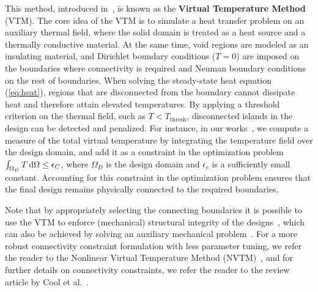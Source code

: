 This method, introduced in~\cite{li_structural_2016}, is known as the \textbf{Virtual Temperature Method} (VTM). The core idea of the VTM is to simulate a heat transfer problem on an auxiliary thermal field, where the solid domain
 is treated as a heat source and a thermally conductive material. At the same time, void regions are modeled as an
insulating material, and Dirichlet boundary conditions ($T = 0$) are imposed on the boundaries where connectivity is required and Neuman boundary conditions
on the rest of boundaries. When 
solving the steady-state heat equation (\eqref{eq:heat}), regions that are disconnected from the boundary 
cannot dissipate heat and therefore attain elevated temperatures. By applying a threshold criterion on the thermal field, such as $T < T_\text{thresh}$, disconnected islands in the design can be 
detected and penalized. For instance, in our works~\cite{ownpub1,ownpub2}, we compute a measure of the total virtual temperature
by integrating the temperature field over the design domain, and add it as a constraint in the optimization problem 
$\int_{\Omega_D} T \mathop{}\!\text{d} \Omega \leq \epsilon_C$, where $\Omega_D$ is the design domain and $\epsilon_c$ is a sufficiently small constant. Accounting for this constraint in the optimization problem ensures that the final design remains physically connected to the required 
boundaries. 


Note that by appropriately selecting the connecting boundaries it is possible to use the VTM to enforce
(mechanical) structural integrity of the designs~\cite{structural_heat}, which can also be achieved by solving an auxiliary
mechanical problem~\cite{structural_integrity}. For a more robust connectivity constraint formulation with less parameter tuning, we refer the reader to the Nonlinear 
Virtual Temperature Method (NVTM)~\cite{nvtm}, and for further details on connectivity constraints, we refer the reader to the review 
article by Cool et al.~\cite{vanessa}.
